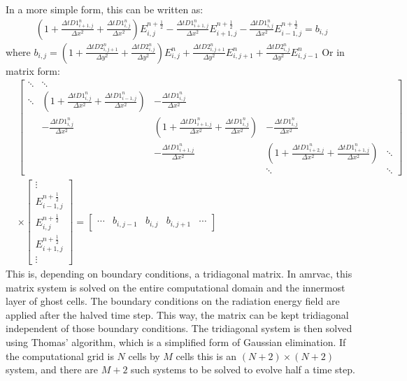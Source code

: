 In a more simple form, this can be written as:
\begin{align}
\left(1 + \frac{\Delta t D1_{i+1,j}^{n}}{\Delta x^2} + \frac{\Delta t D1_{i,j}^{n}}{\Delta x^2} \right) E_{i,j}^{n+\frac{1}{2}} - \frac{\Delta t D1_{i+1,j}^{n}}{\Delta x^2} E_{i+1,j}^{n+\frac{1}{2}} - \frac{\Delta t D1_{i,j}^{n}}{\Delta x^2} E_{i-1,j}^{n+\frac{1}{2}} = b_{i,j}
\end{align}
where $b_{i,j} = \left(1 + \frac{\Delta t D2_{i,j+1}^{n}}{\Delta y^2} + \frac{\Delta t D2_{i,j}^{n}}{\Delta y^2}\right) E_{i,j}^{n} + \frac{\Delta t D2_{i,j+1}^{n}}{\Delta y^2} E_{i,j+1}^{n} + \frac{\Delta t D2_{i,j}^{n}}{\Delta y^2} E_{i,j-1}^{n}$
Or in matrix form:
\begin{align}
&\begin{bmatrix}
\ddots & \ddots & & &\\
\ddots & \left(1 + \frac{\Delta t D1_{i,j}^{n}}{\Delta x^2} + \frac{\Delta t D1_{i-1,j}^{n}}{\Delta x^2} \right) & -\frac{\Delta t D1_{i,j}^{n}}{\Delta x^2} & & \\
& -\frac{\Delta t D1_{i,j}^{n}}{\Delta x^2} & \left(1 + \frac{\Delta t D1_{i+1,j}^{n}}{\Delta x^2} + \frac{\Delta t D1_{i,j}^{n}}{\Delta x^2} \right) & - \frac{\Delta t D1_{i,j}^{n}}{\Delta x^2} & \\
& & -\frac{\Delta t D1_{i+1,j}^{n}}{\Delta x^2} & \left(1 + \frac{\Delta t D1_{i+2,j}^{n}}{\Delta x^2} + \frac{\Delta t D1_{i+1,j}^{n}}{\Delta x^2} \right) & \ddots \\
& & & \ddots & \ddots
\end{bmatrix} \\
&\times
\begin{bmatrix}
           \vdots                    \\
           E_{i-1,j}^{n+\frac{1}{2}} \\
           E_{i,j}^{n+\frac{1}{2}}   \\
           E_{i+1,j}^{n+\frac{1}{2}} \\
           \vdots
\end{bmatrix} 
=
\begin{bmatrix}
           \cdots & b_{i,j-1} & b_{i,j} & b_{i,j+1} & \cdots
\end{bmatrix}
\end{align}
This is, depending on boundary conditions, a tridiagonal matrix. In amrvac, this matrix system is solved on the entire computational domain and the innermost layer of ghost cells. The boundary conditions on the radiation energy field are applied after the halved time step. This way, the matrix can be kept tridiagonal independent of those boundary conditions. The tridiagonal system is then solved using Thomas' algorithm, which is a simplified form of Gaussian elimination. If the computational grid is $N$ cells by $M$ cells this is an $(N+2) \times (N+2)$ system, and there are $M+2$ such systems to be solved to evolve half a time step. \\

